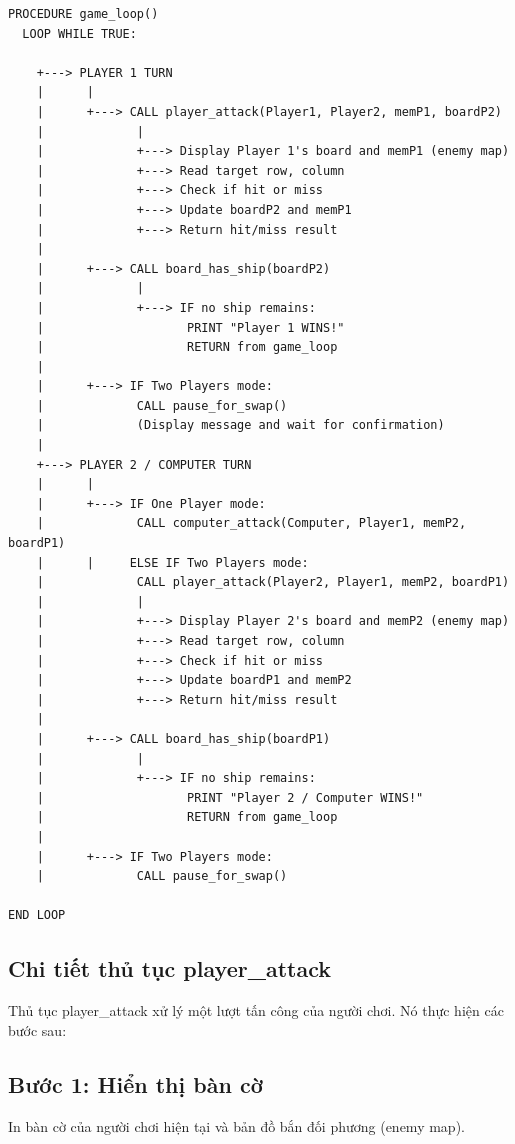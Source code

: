 \begin{verbatim}
PROCEDURE game_loop()
  LOOP WHILE TRUE:
    
    +---> PLAYER 1 TURN
    |      |
    |      +---> CALL player_attack(Player1, Player2, memP1, boardP2)
    |             |
    |             +---> Display Player 1's board and memP1 (enemy map)
    |             +---> Read target row, column
    |             +---> Check if hit or miss
    |             +---> Update boardP2 and memP1
    |             +---> Return hit/miss result
    |
    |      +---> CALL board_has_ship(boardP2)
    |             |
    |             +---> IF no ship remains:
    |                    PRINT "Player 1 WINS!"
    |                    RETURN from game_loop
    |
    |      +---> IF Two Players mode:
    |             CALL pause_for_swap()
    |             (Display message and wait for confirmation)
    |
    +---> PLAYER 2 / COMPUTER TURN
    |      |
    |      +---> IF One Player mode:
    |             CALL computer_attack(Computer, Player1, memP2, boardP1)
    |      |     ELSE IF Two Players mode:
    |             CALL player_attack(Player2, Player1, memP2, boardP1)
    |             |
    |             +---> Display Player 2's board and memP2 (enemy map)
    |             +---> Read target row, column
    |             +---> Check if hit or miss
    |             +---> Update boardP1 and memP2
    |             +---> Return hit/miss result
    |
    |      +---> CALL board_has_ship(boardP1)
    |             |
    |             +---> IF no ship remains:
    |                    PRINT "Player 2 / Computer WINS!"
    |                    RETURN from game_loop
    |
    |      +---> IF Two Players mode:
    |             CALL pause_for_swap()

END LOOP
\end{verbatim}

\subsection{Chi tiết thủ tục player\_attack}

Thủ tục player\_attack xử lý một lượt tấn công của người chơi. Nó thực hiện các bước sau:

\subsection{Bước 1: Hiển thị bàn cờ}

In bàn cờ của người chơi hiện tại và bản đồ bắn đối phương (enemy map).

